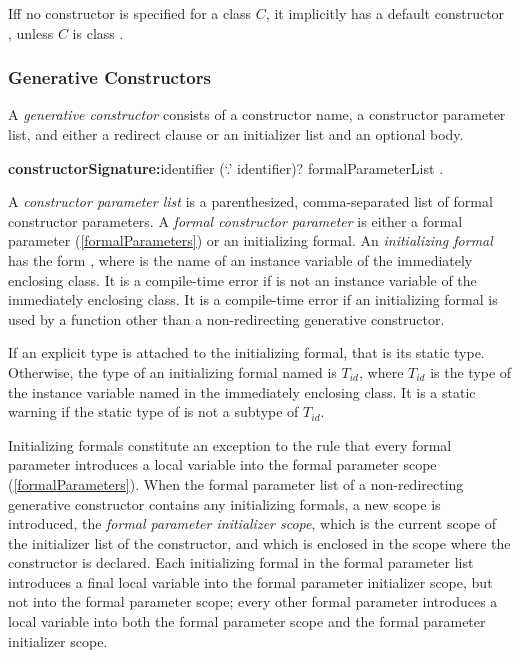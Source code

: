 \documentclass{article}
\begin{document}
\LMHash{}
If{}f no constructor is specified for a class $C$, it implicitly has a default constructor , unless $C$ is class .


\subsubsection{Generative Constructors}

\LMHash{}
A {\em generative constructor} consists of a constructor name, a constructor parameter list, and either a redirect clause or an initializer list and an optional body.

\begin{grammar}
{\bf constructorSignature:}identifier (`{\escapegrammar .}' identifier)? formalParameterList
  .
\end{grammar}

\LMHash{}
A {\em constructor parameter list} is a parenthesized, comma-separated list of formal constructor parameters.
A {\em formal constructor parameter} is either a formal parameter (\ref{formalParameters}) or an initializing formal.
An {\em initializing formal} has the form , where \id{} is the name of an instance variable of the immediately enclosing class.
It is a compile-time error if \id{} is not an instance variable of the immediately enclosing class.
It is a compile-time error if an initializing formal is used by a function other than a non-redirecting generative constructor.

\LMHash{}
If an explicit type is attached to the initializing formal, that is its static type.
Otherwise, the type of an initializing formal named \id{} is $T_{id}$, where $T_{id}$ is the type of the instance variable named \id{} in the immediately enclosing class.
It is a static warning if the static type of \id{} is not a subtype of $T_{id}$.

\LMHash{}
Initializing formals constitute an exception to the rule that every formal parameter introduces a local variable into the formal parameter scope (\ref{formalParameters}).
When the formal parameter list of a non-redirecting generative constructor contains any initializing formals, a new scope is introduced, the {\em formal parameter initializer scope}, which is the current scope of the initializer list of the constructor, and which is enclosed in the scope where the constructor is declared.
Each initializing formal in the formal parameter list introduces a final local variable into the formal parameter initializer scope, but not into the formal parameter scope; every other formal parameter introduces a local variable into both the formal parameter scope and the formal parameter initializer scope.
\end{document}
